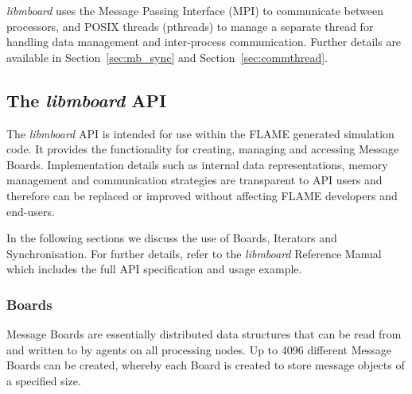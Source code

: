 \textit{libmboard} uses the Message Passing Interface (MPI) to communicate between processors, and POSIX threads (pthreads) to manage a separate thread for handling data management and inter-process communication. Further details are available in Section~\ref{sec:mb_sync} and Section~\ref{sec:commthread}.

\subsection{The \textit{libmboard} API}
\label{sec:mb_api}

The  \textit{libmboard} API is intended for use within the FLAME generated simulation code. It provides the functionality for creating, managing and accessing Message Boards. Implementation details such as internal data representations, memory management and communication strategies are transparent to API users and therefore can be replaced or improved without affecting FLAME developers and end-users.

In the following sections we discuss the use of Boards, Iterators and Synchronisation. For further details, refer to the \textit{libmboard} Reference Manual \cite{MessageBoardAPI} which includes the full API specification and usage example.


\subsubsection{Boards}

Message Boards are essentially distributed data structures that can be read from and written to by agents on all processing nodes. Up to 4096 different Message Boards can be created, whereby each Board is created to store message objects of a specified size.


